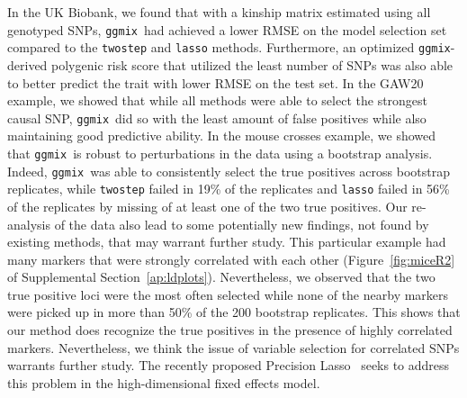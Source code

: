 \documentclass[12pt,letter]{article}\usepackage[]{graphicx}\usepackage[]{color}
\newcommand{\ggmix}{\texttt{ggmix}}
\begin{document}
In the UK Biobank, we found that with a kinship matrix estimated using all genotyped SNPs, \ggmix ~had achieved a lower RMSE on the model selection set compared to the \texttt{twostep} and \texttt{lasso} methods. Furthermore, an optimized \ggmix-derived polygenic risk score that utilized the least number of SNPs was also able to better predict the trait with lower RMSE on the test set.
In the GAW20 example, we showed that while all methods were able to select the strongest causal SNP, \ggmix ~did so with the least amount of false positives while also maintaining good predictive ability. In the mouse crosses example, we showed that \ggmix ~is robust to perturbations in the data using a bootstrap analysis. Indeed, \ggmix ~was able to consistently select the true positives across bootstrap replicates, while \texttt{twostep} failed in 19\% of the replicates and \texttt{lasso} failed in 56\% of the replicates by missing of at least one of the two true positives. Our re-analysis of the data also lead to some potentially new findings, not found by existing methods, that may warrant further study. This particular example had many markers that were strongly correlated with each other (Figure~\ref{fig:miceR2} of Supplemental Section~\ref{ap:ldplots}). Nevertheless, we observed that the two true positive loci were the most often selected while none of the nearby markers were picked up in more than 50\% of the 200 bootstrap replicates. This shows that our method does recognize the true positives in the presence of highly correlated markers. Nevertheless, we think the issue of variable selection for correlated SNPs warrants further study. The recently proposed Precision Lasso~\citep{wang2018precision} seeks to address this problem in the high-dimensional fixed effects model.
\end{document}
